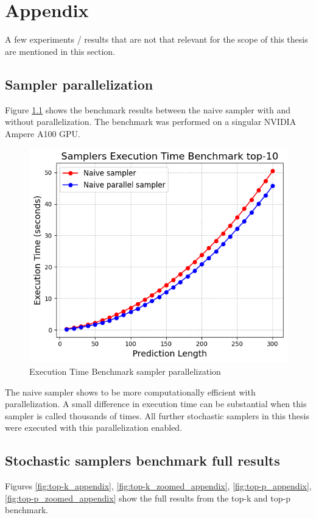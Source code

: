 \chapter{Appendix}
\label{chap:appendix}

A few experiments / results that are not that relevant for the scope of this thesis are mentioned in this section.

\section{Sampler parallelization}
\label{sec:sampler_parallelization}
Figure \ref{fig:sampler_parallelization} shows the benchmark results between the naive sampler with and without parallelization.
The benchmark was performed on a singular NVIDIA Ampere A100 GPU.
\begin{figure}[h]
    \centering
    \includegraphics[width=0.6\linewidth]{figures/appendix/sampler_parallel.png}
    \caption{Execution Time Benchmark sampler parallelization}
    \label{fig:sampler_parallelization}
\end{figure}

The naive sampler shows to be more computationally efficient with parallelization.
A small difference in execution time can be substantial when this sampler is called thousands of times.
All further stochastic samplers in this thesis were executed with this parallelization enabled.

\section{Stochastic samplers benchmark full results}
\label{sec:sampler_full_results}

Figures \ref{fig:top-k_appendix}, \ref{fig:top-k_zoomed_appendix}, \ref{fig:top-p_appendix}, \ref{fig:top-p_zoomed_appendix} show the full results from the top-k and top-p benchmark.

